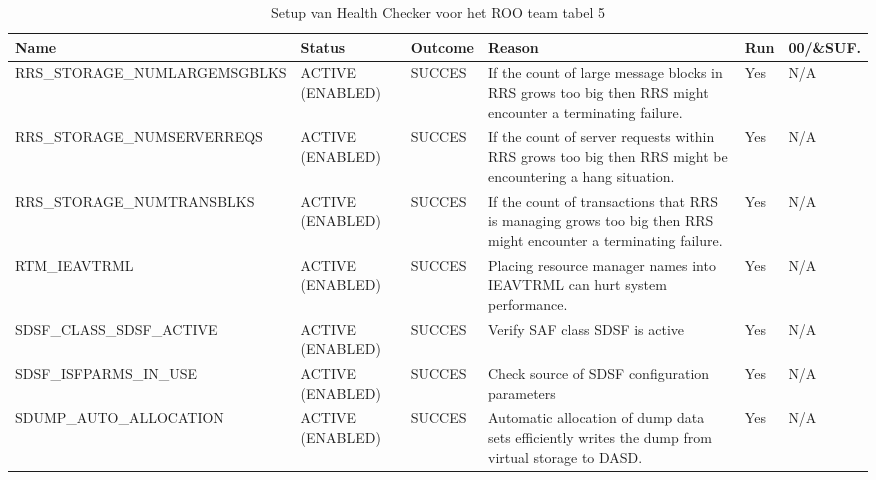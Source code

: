 \begin{landscape}
	\begin{table}[h]
		\begin{tabular}{|l|p{2.3cm}|l|p{4.5cm}|l|l|}
			\hline
			\textbf{Name}                       & \textbf{Status}   & \textbf{Outcome} & \textbf{Reason}    & \textbf{Run} &	\textbf{00/\&SUF.} \\ \hline
			RRS\_STORAGE\_NUMLARGEMSGBLKS & ACTIVE (ENABLED) & SUCCES & If the   count of large message blocks in RRS grows too big then RRS might encounter a   terminating failure.       & Yes & N/A \\ \hline
			RRS\_STORAGE\_NUMSERVERREQS   & ACTIVE (ENABLED) & SUCCES & If the   count of server requests within RRS grows too big then RRS might be   encountering a hang situation.       & Yes & N/A \\ \hline
			RRS\_STORAGE\_NUMTRANSBLKS    & ACTIVE (ENABLED) & SUCCES & If the   count of transactions that RRS is managing grows too big then RRS might   encounter a terminating failure. & Yes & N/A \\ \hline
			RTM\_IEAVTRML                 & ACTIVE (ENABLED) & SUCCES & Placing   resource manager names into IEAVTRML can hurt system performance.                                         & Yes & N/A \\ \hline
			SDSF\_CLASS\_SDSF\_ACTIVE     & ACTIVE (ENABLED) & SUCCES & Verify   SAF class SDSF is active                                                                                   & Yes & N/A \\ \hline
			SDSF\_ISFPARMS\_IN\_USE       & ACTIVE (ENABLED) & SUCCES & Check   source of SDSF configuration parameters                                                                     & Yes & N/A \\ \hline
			SDUMP\_AUTO\_ALLOCATION       & ACTIVE (ENABLED) & SUCCES & Automatic   allocation of dump data sets efficiently writes the dump from virtual storage   to DASD.                & Yes & N/A \\ \hline	
		\end{tabular}
		\caption[Health Checker ROO team tabel 5]{Setup van Health Checker voor het ROO team tabel 5}
		\label{tbl:ROO Team Tabel 5}
	\end{table}
\end{landscape}

